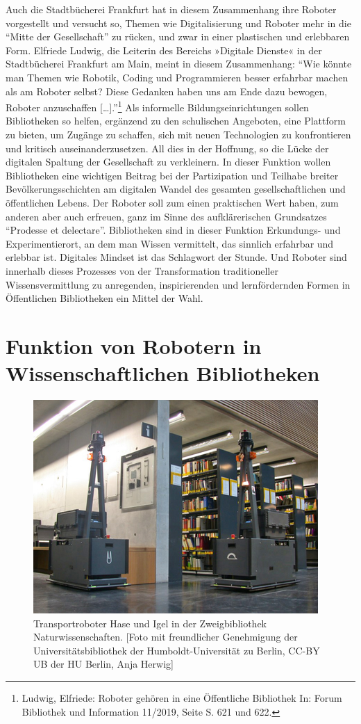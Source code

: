 \documentclass[a4paper,
fontsize=11pt,
oneside,
numbers=noperiodatend,
parskip=half-,
bibliography=totoc,
final
]{scrartcl}
\begin{document}
Auch die Stadtbücherei Frankfurt hat in diesem Zusammenhang ihre Roboter
vorgestellt und versucht so, Themen wie Digitalisierung und Roboter mehr
in die \enquote{Mitte der Gesellschaft} zu rücken, und zwar in einer
plastischen und erlebbaren Form. Elfriede Ludwig, die Leiterin des
Bereichs »Digitale Dienste« in der Stadtbücherei Frankfurt am Main,
meint in diesem Zusammenhang: \enquote{Wie könnte man Themen wie
Robotik, Coding und Programmieren besser erfahrbar machen als am Roboter
selbst? Diese Gedanken haben uns am Ende dazu bewogen, Roboter
anzuschaffen {[}\ldots{]}.}\footnote{Ludwig, Elfriede: Roboter gehören
  in eine Öffentliche Bibliothek In: Forum Bibliothek und Information
  11/2019, Seite S. 621 und 622.} Als informelle Bildungseinrichtungen
sollen Bibliotheken so helfen, ergänzend zu den schulischen Angeboten,
eine Plattform zu bieten, um Zugänge zu schaffen, sich mit neuen
Technologien zu konfrontieren und kritisch auseinanderzusetzen. All dies
in der Hoffnung, so die Lücke der digitalen Spaltung der Gesellschaft zu
verkleinern. In dieser Funktion wollen Bibliotheken eine wichtigen
Beitrag bei der Partizipation und Teilhabe breiter Bevölkerungsschichten
am digitalen Wandel des gesamten gesellschaftlichen und öffentlichen
Lebens. Der Roboter soll zum einen praktischen Wert haben, zum anderen
aber auch erfreuen, ganz im Sinne des aufklärerischen Grundsatzes
\enquote{Prodesse et delectare}. Bibliotheken sind in dieser Funktion
Erkundungs- und Experimentierort, an dem man Wissen vermittelt, das
sinnlich erfahrbar und erlebbar ist. Digitales Mindset ist das
Schlagwort der Stunde. Und Roboter sind innerhalb dieses Prozesses von
der Transformation traditioneller Wissensvermittlung zu anregenden,
inspirierenden und lernfördernden Formen in Öffentlichen Bibliotheken
ein Mittel der Wahl.

\hypertarget{funktion-von-robotern-in-wissenschaftlichen-bibliotheken}{%
\section{Funktion von Robotern in Wissenschaftlichen
Bibliotheken}\label{funktion-von-robotern-in-wissenschaftlichen-bibliotheken}}

\begin{figure}
\centering
\includegraphics[width=.5\textwidth]{img/HaseIgel.png}
\caption{Transportroboter Hase und Igel in der Zweigbibliothek
Naturwissenschaften. {[}Foto mit freundlicher Genehmigung der
Universitätsbibliothek der Humboldt-Universität zu Berlin, CC-BY UB der
HU Berlin, Anja Herwig{]}}
\end{figure}
\end{document}
